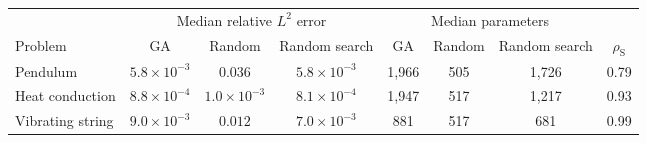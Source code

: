 \begin{tabular}{l ccc ccc c}
\toprule
 & \multicolumn{3}{c}{Median relative $L^2$ error} & \multicolumn{3}{c}{Median parameters} & \\
\cmidrule(lr){2-4}\cmidrule(lr){5-7}
Problem & GA & Random & Random search & GA & Random & Random search & $\rho_{\mathrm{S}}$ \\
\midrule
Pendulum & $5.8 \times 10^{-3}$ & $0.036$ & $5.8 \times 10^{-3}$ & 1,966 & 505 & 1,726 & 0.79 \\
Heat conduction & $8.8 \times 10^{-4}$ & $1.0 \times 10^{-3}$ & $8.1 \times 10^{-4}$ & 1,947 & 517 & 1,217 & 0.93 \\
Vibrating string & $9.0 \times 10^{-3}$ & $0.012$ & $7.0 \times 10^{-3}$ & 881 & 517 & 681 & 0.99 \\
\bottomrule
\end{tabular}
